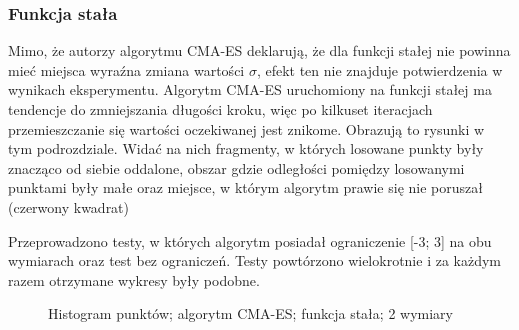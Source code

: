\documentclass{mini}
\begin{document}
\subsubsection*{Funkcja stała}
\hspace{3,4ex}Mimo, że autorzy algorytmu CMA-ES deklarują, że dla funkcji stałej nie powinna mieć miejsca wyraźna zmiana wartości $\sigma$, efekt ten nie znajduje potwierdzenia w wynikach eksperymentu. Algorytm CMA-ES uruchomiony na funkcji stałej ma tendencje do zmniejszania długości kroku, więc po kilkuset iteracjach przemieszczanie się wartości oczekiwanej jest znikome. Obrazują to rysunki w tym podrozdziale. Widać na nich fragmenty, w których losowane punkty były znacząco od siebie oddalone, obszar gdzie odległości pomiędzy losowanymi punktami były małe oraz miejsce, w którym algorytm prawie się nie poruszał (czerwony kwadrat)

Przeprowadzono testy, w których algorytm posiadał ograniczenie [-3; 3] na obu wymiarach oraz test bez ograniczeń. Testy powtórzono wielokrotnie i za każdym razem otrzymane wykresy były podobne.

\begin{figure}[H]
\centering
{}
\quad
{}
\caption{Histogram punktów; algorytm CMA-ES; funkcja stała; 2 wymiary}
\end{figure}
\end{document}
